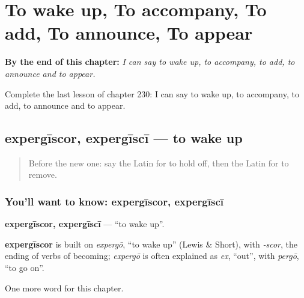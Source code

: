 
\chapter{To wake up, To accompany, To add, To announce, To appear}
\label{ch:la-to-wake-up-to-accompany-to-add-to-announce-to-appear}

\begin{chapteropening}
\textbf{By the end of this chapter:} \emph{I can say to wake up, to accompany, to add, to announce and to appear.}

Complete the last lesson of chapter 230: I can say to wake up, to accompany, to add, to announce and to appear.
\end{chapteropening}

\section[expergīscor, expergīscī]{expergīscor, expergīscī — to wake up}

\label{lesson:LA-C230-expergiscor}



\begin{quote}
Before the new one: say the Latin for to hold off, then the Latin for to remove.
\end{quote}

\subsection*{You'll want to know: expergīscor, expergīscī}
\textbf{expergīscor, expergīscī} — \textquotedblleft{}to wake up\textquotedblright{}.

\begin{cousinweb}
\textbf{expergīscor} is built on \emph{expergō}, \textquotedblleft{}to wake up\textquotedblright{} (Lewis \& Short), with \emph{-scor}, the ending of verbs of becoming; \emph{expergō} is often explained as \emph{ex}, \textquotedblleft{}out\textquotedblright{}, with \emph{pergō}, \textquotedblleft{}to go on\textquotedblright{}.
\end{cousinweb}

\begin{grammarlens}[title={What you've built}]
One more word for this chapter.
\end{grammarlens}

